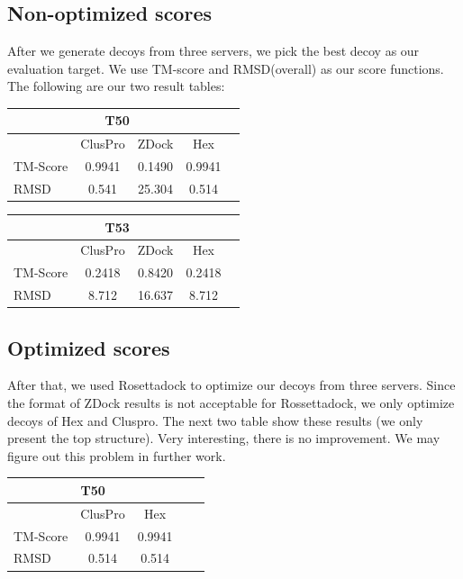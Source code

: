 \documentclass{article}
\begin{document}
\subsection{Non-optimized scores}

After we generate decoys from three servers, we pick the best decoy as our evaluation target. We use TM-score and RMSD(overall) as our score functions. The following are our two result tables:

\begin{center}
\begin{tabular}{|l|c|c|c|r|}
\multicolumn{4}{c}{T50} \\
    \hline
      & ClusPro & ZDock & Hex \\ \hline
    TM-Score & 0.9941 & 0.1490 & 0.9941 \\ \hline
    RMSD & 0.541 & 25.304 & 0.514 \\
    \hline
    \end{tabular}
\end{center}

\begin{center}
\begin{tabular}{|l|c|c|c|r|}
\multicolumn{4}{c}{T53} \\
    \hline
      & ClusPro & ZDock & Hex \\ \hline
    TM-Score & 0.2418 & 0.8420 & 0.2418 \\ \hline
    RMSD & 8.712 & 16.637 & 8.712 \\
    \hline
    \end{tabular}
\end{center}


\subsection{Optimized scores}

After that, we used Rosettadock to optimize our decoys from three servers. Since the format of ZDock results is not acceptable for Rossettadock, we only optimize decoys of Hex and Cluspro. The next two table show these results (we only present the top structure). Very interesting, there is no improvement. We may figure out this problem in further work.

\begin{center}
\begin{tabular}{|l|c|c|c|r|}
\multicolumn{3}{c}{T50} \\
    \hline
      & ClusPro & Hex \\ \hline
    TM-Score & 0.9941 & 0.9941 \\ \hline
    RMSD & 0.514 & 0.514 \\
    \hline
    \end{tabular}
\end{center}
\end{document}

